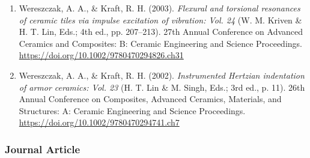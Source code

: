 \documentclass[
]{article}
\begin{document}
\begin{enumerate}
{  Engineering and Science Proceedings: Vol. 31}. John Wiley \& Sons,
  Inc. \url{https://doi.org/10.1002/9780470944004}
\item
  Wereszczak, A. A., \& Kraft, R. H. (2003). \emph{Flexural and
  torsional resonances of ceramic tiles via impulse excitation of
  vibration: Vol. 24} (W. M. Kriven \& H. T. Lin, Eds.; 4th ed., pp.
  207--213). 27th Annual Conference on Advanced Ceramics and Composites:
  B: Ceramic Engineering and Science Proceedings.
  \url{https://doi.org/10.1002/9780470294826.ch31}
\item
  Wereszczak, A. A., \& Kraft, R. H. (2002). \emph{Instrumented Hertzian
  indentation of armor ceramics: Vol. 23} (H. T. Lin \& M. Singh, Eds.;
  3rd ed., p. 11). 26th Annual Conference on Composites, Advanced
  Ceramics, Materials, and Structures: A: Ceramic Engineering and
  Science Proceedings. \url{https://doi.org/10.1002/9780470294741.ch7}
\end{enumerate}

\subsubsection{Journal Article}\label{journal-article}
\end{document}
